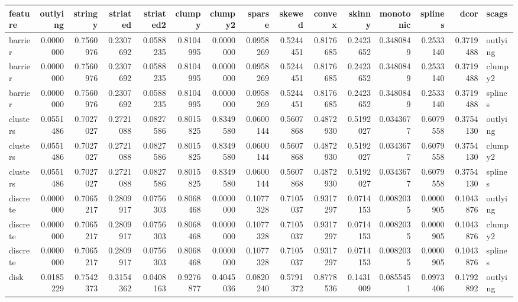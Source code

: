 \begin{Schunk}

\begin{tabular}{l|r|r|r|r|r|r|r|r|r|r|r|r|r|l}
\hline
feature & outlying & stringy & striated & striated2 & clumpy & clumpy2 & sparse & skewed & convex & skinny & monotonic & splines & dcor & scags\\
\hline
barrier & 0.0000000 & 0.7560976 & 0.2307692 & 0.0588235 & 0.8104995 & 0.0000000 & 0.0958269 & 0.5244451 & 0.8176685 & 0.2423652 & 0.3480849 & 0.2533140 & 0.3719488 & outlying\\
\hline
barrier & 0.0000000 & 0.7560976 & 0.2307692 & 0.0588235 & 0.8104995 & 0.0000000 & 0.0958269 & 0.5244451 & 0.8176685 & 0.2423652 & 0.3480849 & 0.2533140 & 0.3719488 & clumpy2\\
\hline
barrier & 0.0000000 & 0.7560976 & 0.2307692 & 0.0588235 & 0.8104995 & 0.0000000 & 0.0958269 & 0.5244451 & 0.8176685 & 0.2423652 & 0.3480849 & 0.2533140 & 0.3719488 & splines\\
\hline
clusters & 0.0551486 & 0.7027027 & 0.2721088 & 0.0827586 & 0.8015825 & 0.8349580 & 0.0600144 & 0.5607868 & 0.4872930 & 0.5192027 & 0.0343677 & 0.6079558 & 0.3754130 & outlying\\
\hline
clusters & 0.0551486 & 0.7027027 & 0.2721088 & 0.0827586 & 0.8015825 & 0.8349580 & 0.0600144 & 0.5607868 & 0.4872930 & 0.5192027 & 0.0343677 & 0.6079558 & 0.3754130 & clumpy2\\
\hline
clusters & 0.0551486 & 0.7027027 & 0.2721088 & 0.0827586 & 0.8015825 & 0.8349580 & 0.0600144 & 0.5607868 & 0.4872930 & 0.5192027 & 0.0343677 & 0.6079558 & 0.3754130 & splines\\
\hline
discrete & 0.0000000 & 0.7065217 & 0.2809917 & 0.0756303 & 0.8068468 & 0.0000000 & 0.1077328 & 0.7105037 & 0.9317297 & 0.0714153 & 0.0082035 & 0.0000905 & 0.1043876 & outlying\\
\hline
discrete & 0.0000000 & 0.7065217 & 0.2809917 & 0.0756303 & 0.8068468 & 0.0000000 & 0.1077328 & 0.7105037 & 0.9317297 & 0.0714153 & 0.0082035 & 0.0000905 & 0.1043876 & clumpy2\\
\hline
discrete & 0.0000000 & 0.7065217 & 0.2809917 & 0.0756303 & 0.8068468 & 0.0000000 & 0.1077328 & 0.7105037 & 0.9317297 & 0.0714153 & 0.0082035 & 0.0000905 & 0.1043876 & splines\\
\hline
disk & 0.0185229 & 0.7542373 & 0.3154362 & 0.0408163 & 0.9276877 & 0.4045036 & 0.0820240 & 0.5791372 & 0.8778536 & 0.1431009 & 0.0855451 & 0.0973406 & 0.1792892 & outlying\\

\end{tabular}
\end{Schunk}
